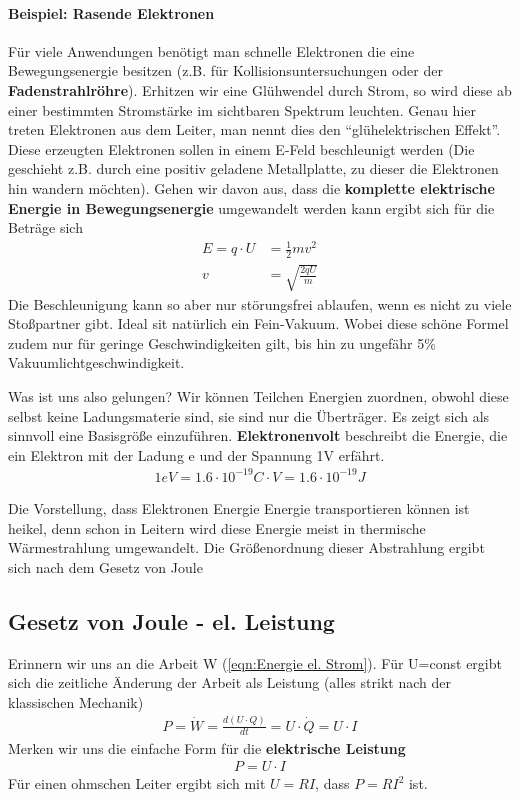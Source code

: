 \paragraph{Beispiel: Rasende Elektronen} \label{bsp:Elektronenbeschleunigung}
Für viele Anwendungen benötigt man schnelle Elektronen die eine Bewegungsenergie besitzen (z.B. für Kollisionsuntersuchungen oder der \textbf{Fadenstrahlröhre}). Erhitzen wir eine Glühwendel durch Strom, so wird diese ab einer bestimmten Stromstärke im sichtbaren Spektrum leuchten. Genau hier treten Elektronen aus dem Leiter, man nennt dies den "`glühelektrischen Effekt"'.
Diese erzeugten Elektronen sollen in einem E-Feld beschleunigt werden (Die geschieht z.B. durch eine positiv geladene Metallplatte, zu dieser die Elektronen hin wandern möchten). Gehen wir davon aus, dass die \textbf{komplette elektrische Energie in Bewegungsenergie} umgewandelt werden kann ergibt sich für die Beträge sich\begin{align*}
E = q \cdot U &= \frac{1}{2} m v^2 \\
 v &= \sqrt{\frac{2qU}{m}} 
\end{align*}Die Beschleunigung kann so aber nur störungsfrei ablaufen, wenn es nicht zu viele Stoßpartner gibt. Ideal sit natürlich ein Fein-Vakuum. Wobei diese schöne Formel zudem nur für geringe Geschwindigkeiten gilt, bis hin zu ungefähr 5\% Vakuumlichtgeschwindigkeit.

Was ist uns also gelungen? Wir können Teilchen Energien zuordnen, obwohl diese selbst keine Ladungsmaterie sind, sie sind nur die Überträger. Es zeigt sich als sinnvoll eine Basisgröße einzuführen. \textbf{Elektronenvolt} beschreibt die  Energie, die ein Elektron mit der Ladung e und der Spannung 1V erfährt. \begin{align} \label{eqn:Elektronenvolt}
\boxed{1eV = 1.6 \cdot 10^{-19} C \cdot V = 1.6 \cdot 10^{-19}J}
\end{align}
 
 Die Vorstellung, dass Elektronen Energie Energie transportieren können ist heikel, denn schon in Leitern wird diese Energie meist in thermische Wärmestrahlung umgewandelt. Die Größenordnung dieser Abstrahlung ergibt sich nach dem Gesetz von Joule
 
 
\subsection{Gesetz von Joule - el. Leistung}
Erinnern wir uns an die Arbeit W (\ref{eqn:Energie el. Strom}). Für U=const ergibt sich die zeitliche Änderung der Arbeit als Leistung (alles strikt nach der klassischen Mechanik)
\begin{align} \label{eqn:elLeistung}
P = \dot{W} = \frac{d (U\cdot Q)}{dt} = U \cdot \dot{Q} = U \cdot I
\end{align} Merken wir uns die einfache Form für die \textbf{elektrische Leistung}
\begin{align*}
\boxed{P = U \cdot I}
\end{align*}
Für einen ohmschen Leiter ergibt sich mit $U = RI$, dass $P = RI^2$ ist.